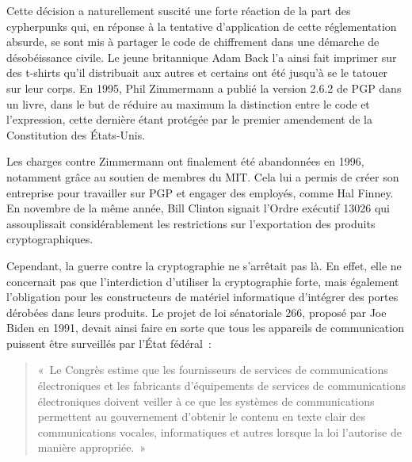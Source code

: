 Cette décision a naturellement suscité une forte réaction de la part des cypherpunks qui, en réponse à la tentative d'application de cette réglementation absurde, se sont mis à partager le code de chiffrement dans une démarche de désobéissance civile. Le jeune britannique Adam Back l'a ainsi fait imprimer sur des t-shirts qu'il distribuait aux autres et certains ont été jusqu'à se le tatouer sur leur corps. En 1995, Phil Zimmermann a publié la version 2.6.2 de PGP dans un livre, dans le but de réduire au maximum la distinction entre le code et l'expression, cette dernière étant protégée par le premier amendement de la Constitution des États-Unis.

Les charges contre Zimmermann ont finalement été abandonnées en 1996, notamment grâce au soutien de membres du MIT. Cela lui a permis de créer son entreprise pour travailler sur PGP et engager des employés, comme Hal Finney. En novembre de la même année, Bill Clinton signait l'Ordre exécutif 13026 qui assouplissait considérablement les restrictions sur l'exportation des produits cryptographiques.


Cependant, la guerre contre la cryptographie ne s'arrêtait pas là. En effet, elle ne concernait pas que l'interdiction d'utiliser la cryptographie forte, mais également l'obligation pour les constructeurs de matériel informatique d'intégrer des portes dérobées dans leurs produits. Le projet de loi sénatoriale 266, proposé par Joe Biden en 1991, devait ainsi faire en sorte que tous les appareils de communication puissent être surveillés par l'État fédéral~: %

\begin{quote}
«~Le Congrès estime que les fournisseurs de services de communications électroniques et les fabricants d'équipements de services de communications électroniques doivent veiller à ce que les systèmes de communications permettent au gouvernement d'obtenir le contenu en texte clair des communications vocales, informatiques et autres lorsque la loi l'autorise de manière appropriée.~»
\end{quote} %

